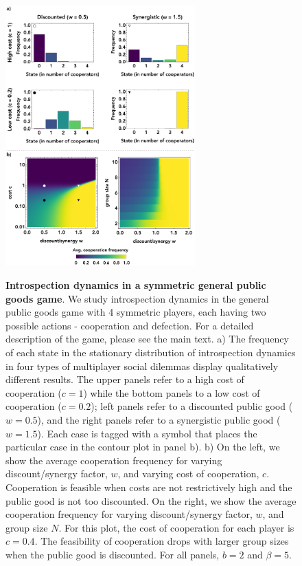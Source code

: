 \documentclass[11pt]{article}
\theoremstyle{plainCl1}
\theoremstyle{plainCl2}
\begin{document}
\begin{figure}
\centering
\includegraphics[width =  0.65\textwidth, keepaspectratio]{figures/Fig3.eps}~\\[0.4cm]
\caption{\onehalfspacing
\textbf{Introspection dynamics in a symmetric general public goods game}. We study introspection dynamics in the general public goods game with 4 symmetric players, each having two possible actions - cooperation and defection. For a detailed description of the game, please see the main text. a) The frequency of each state in the stationary distribution of introspection dynamics in four types of multiplayer social dilemmas display qualitatively different results. The upper panels refer to a high cost of cooperation ($c=1$) while the bottom panels to a low cost of cooperation ($c = 0.2$); left panels refer to a discounted public good ($w = 0.5$), and the right panels refer to a synergistic public good ($w = 1.5$). Each case is tagged with a symbol that places the particular case in the contour plot in panel b). b) On the left, we show the average cooperation frequency for varying discount/synergy factor, $w$, and varying cost of cooperation, $c$. Cooperation is feasible when costs are not restrictively high and the public good is not too discounted. On the right, we show the average cooperation frequency for varying discount/synergy factor, $w$, and group size $N$. For this plot, the cost of cooperation for each player is $c = 0.4$. The feasibility of cooperation drops with larger group sizes when the public good is discounted. For all panels, $b=2$ and $\beta = 5$.} 
\label{Fig:GPGG-symmetric}
\end{figure}
\end{document}
